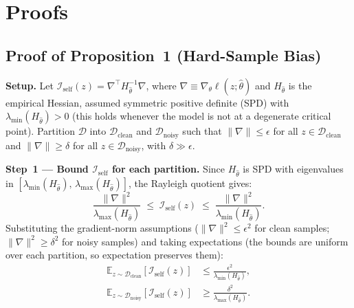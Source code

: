 \section{Proofs}
\label{app:proofs}

\subsection{Proof of Proposition~1 (Hard-Sample Bias)}
\label{app:proof-hsb}

\textbf{Setup.}
Let $\mathcal{I}_\text{self}(z) = \nabla^\top H_{\hat\theta}^{-1} \nabla$, where $\nabla \equiv \nabla_\theta \ell(z;\hat\theta)$ and $H_{\hat\theta}$ is the empirical Hessian, assumed symmetric positive definite (SPD) with $\lambda_{\min}(H_{\hat\theta}) > 0$ (this holds whenever the model is not at a degenerate critical point).
Partition $\mathcal{D}$ into $\mathcal{D}_\text{clean}$ and $\mathcal{D}_\text{noisy}$ such that $\|\nabla\| \leq \epsilon$ for all $z \in \mathcal{D}_\text{clean}$ and $\|\nabla\| \geq \delta$ for all $z \in \mathcal{D}_\text{noisy}$, with $\delta \gg \epsilon$.

\textbf{Step~1 --- Bound $\mathcal{I}_\text{self}$ for each partition.}
Since $H_{\hat\theta}$ is SPD with eigenvalues in $[\lambda_{\min}(H_{\hat\theta}),\, \lambda_{\max}(H_{\hat\theta})]$, the Rayleigh quotient gives:
\begin{equation}
    \frac{\|\nabla\|^2}{\lambda_{\max}(H_{\hat\theta})}
    \;\leq\; \mathcal{I}_\text{self}(z)
    \;\leq\; \frac{\|\nabla\|^2}{\lambda_{\min}(H_{\hat\theta})}.
\end{equation}
Substituting the gradient-norm assumptions ($\|\nabla\|^2 \leq \epsilon^2$ for clean samples; $\|\nabla\|^2 \geq \delta^2$ for noisy samples) and taking expectations (the bounds are uniform over each partition, so expectation preserves them):
\begin{align}
    \mathbb{E}_{z \sim \mathcal{D}_\text{clean}}[\mathcal{I}_\text{self}(z)]
        &\leq \frac{\epsilon^2}{\lambda_{\min}(H_{\hat\theta})}, \\
    \mathbb{E}_{z \sim \mathcal{D}_\text{noisy}}[\mathcal{I}_\text{self}(z)]
        &\geq \frac{\delta^2}{\lambda_{\max}(H_{\hat\theta})}.
\end{align}

